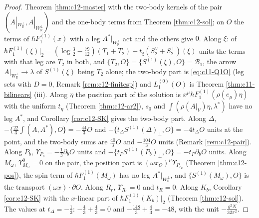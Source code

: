 \begin{proof}
Theorem \ref{thm:c12-master} with the two-body kernels of the pair $(A|_{W_{\mathbb R}^\perp},A|_{W_{\mathbb R}^\perp})$ and the one-body terms from Theorem \ref{thm:c12-sol}; on $O$ the terms of $\hbar F_1^{(1)}(x)$ with a leg $A^*|_{W_{\mathbb R}^\perp}$ act and the others give $0$. Along $\xi$: of $\hbar F_1^{(1)}(\xi)|_2=(\log\tfrac32-\tfrac{79}{12})(T_1+T_2)+t_\xi(S^V_2+S^\perp_2)(\xi)$ units the terms with that leg are $T_2$ in both, and $\{T_2,O\}=\{S^{(1)}(\xi),O\}=\mathcal B_1$, the arrow $A|_{W_{\mathbb R}^\perp}\to\lambda$ of $S^{(1)}(\xi)$ being $T_2$ alone; the two-body part is \eqref{eq:c11-Q1O} (leg sets with $D=0$, Remark \ref{rem:c12-finitesp}) and $L_1^{(0)}(O)$ is Theorem \ref{thm:c11-bilinears} (iii). Along $\eta$ the position part of the solution is $x^\mu\hbar F_1^{(1)}(\rho(e_\mu)\eta)$ with the uniform $t_\eta$ (Theorem \ref{thm:c12-ar2}), $s_0$ and $\int(\rho(A|_V)\eta,\lambda^*)$ have no leg $A^*$, and Corollary \ref{cor:c12-SK} gives the two-body part. Along $\Delta$, $-\{\tfrac{22}3\int(A,A^*),O\}=-\tfrac{44}3O$ and $-\{t_\Delta S^{(1)}(\Delta)_\perp,O\}=-4t_\Delta O$ units at the point, and the two-body sums are $\tfrac{40}3O$ and $-\tfrac{104}3O$ units (Remark \ref{rem:c12-pair}). Along $P_b$, $\Upsilon_{P_b}=-\tfrac13\partial_bO$ units and $-\{t_PS^{(1)}(P_b)_\perp,O\}=-t_P\partial_bO$ units. Along $M_\omega$, $\Upsilon^0_{M_\omega}=0$ on the pair, the position part is $(\omega x_O)^\mu\Upsilon_{P_{e_\mu}}$ (Theorem \ref{thm:c12-pos}), the spin term of $\hbar F_1^{(1)}(M_\omega)$ has no leg $A^*|_{W_{\mathbb R}^\perp}$, and $\{S^{(1)}(M_\omega),O\}$ is the transport $(\omega x)\cdot\partial O$. Along $R_r$, $\Upsilon_{R_r}=0$ and $t_R=0$. Along $K_b$, Corollary \ref{cor:c12-SK} with the $x$-linear part of $\hbar F_1^{(1)}(K_b)|_2$ (Theorem \ref{thm:c12-sol}). The values at $t_\Delta=-\tfrac13$: $-\tfrac43+\tfrac43=0$ and $-\tfrac{148}3+\tfrac43=-48$, with the unit $-\tfrac{g^2N}{32\pi^2}$.
\end{proof}

